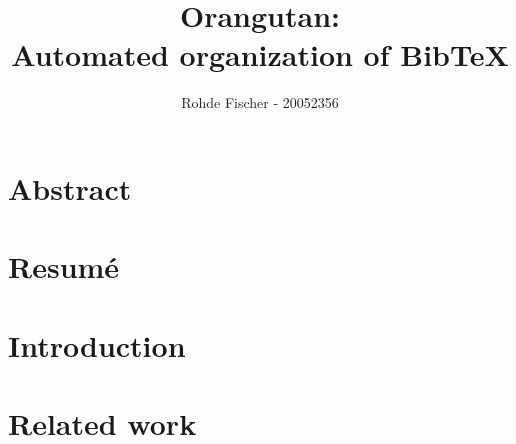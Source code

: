 \documentclass[twoside,11pt,openright,a4paper]{report}
\begin{document}
\author{Rohde Fischer - 20052356}
\title{Orangutan:\\Automated organization of Bib\TeX}

\pagestyle{empty}
\maketitle


\pagestyle{plain}
\setcounter{page}{1}

\chapter*{Abstract}


\chapter*{Resum\'e}


%
%
%
\tableofcontents
{}
\setcounter{secnumdepth}{2}


\chapter{Introduction}
\label{ch:intro}




\chapter{Related work}
\label{ch:related}
\end{document}
